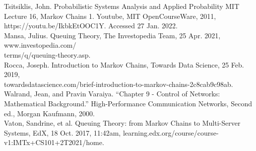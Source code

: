 \documentclass[11pt]{article}
\begin{document}
Tsitsiklis, John. Probabilistic Systems Analysis and Applied Probability MIT Lecture 16, Markov Chains 1. Youtube, MIT OpenCourseWare, 2011, https://youtu.be/IkbkEtOOC1Y. Accessed 27 Jan. 2022. \\

Mansa, Julius. Queuing Theory, The Investopedia Team, 25 Apr. 2021, www.investopedia.com/\\terms/q/queuing-theory.asp. \\

Rocca, Joseph. Introduction to Markov Chains, Towards Data Science, 25 Feb. 2019, \\towardsdatascience.com/brief-introduction-to-markov-chains-2c8cab9c98ab. \\

Walrand, Jean, and Pravin Varaiya. “Chapter 9 - Control of Networks: Mathematical Background.” High-Performance Communication Networks, Second ed., Morgan Kaufmann, 2000.\\

Vaton, Sandrine, et al. Queuing Theory: from Markov Chains to Multi-Server Systems, EdX, 18 Oct. 2017, 11:42am, learning.edx.org/course/course-v1:IMTx+CS101+2T2021/home. 
\end{document}
